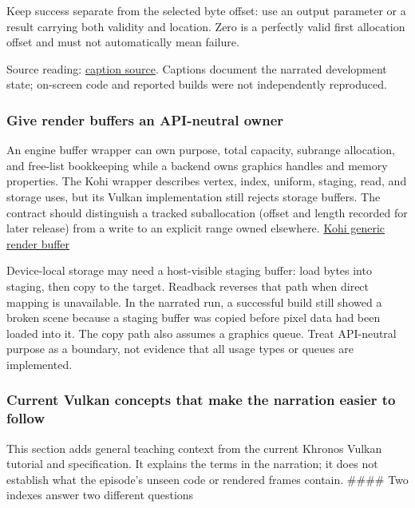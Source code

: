 Keep success separate from the selected byte offset: use an output parameter or a result carrying both validity and location. Zero is a perfectly valid first allocation offset and must not automatically mean failure.

Source reading: \href{https://www.youtube.com/watch?v=SNDJ-rGJd5A}{caption source}. Captions document the narrated development state; on-screen code and reported builds were not independently reproduced.

\subsubsection{Give render buffers an API-neutral owner}\label{06-engine-ii-ch025-give-render-buffers-an-api-neutral-owner}

An engine buffer wrapper can own purpose, total capacity, subrange allocation, and free-list bookkeeping while a backend owns graphics handles and memory properties. The Kohi wrapper describes vertex, index, uniform, staging, read, and storage uses, but its Vulkan implementation still rejects storage buffers. The contract should distinguish a tracked suballocation (offset and length recorded for later release) from a write to an explicit range owned elsewhere. \href{https://www.youtube.com/watch?v=7mNgC7dGkZs}{Kohi generic render buffer}

Device-local storage may need a host-visible staging buffer: load bytes into staging, then copy to the target. Readback reverses that path when direct mapping is unavailable. In the narrated run, a successful build still showed a broken scene because a staging buffer was copied before pixel data had been loaded into it. The copy path also assumes a graphics queue. Treat API-neutral purpose as a boundary, not evidence that all usage types or queues are implemented.

\subsubsection{Current Vulkan concepts that make the narration easier to follow}\label{06-engine-ii-ch025-current-vulkan-concepts-that-make-the-narration-easier-to-follow}

This section adds general teaching context from the current Khronos Vulkan tutorial and specification. It explains the terms in the narration; it does not establish what the episode's unseen code or rendered frames contain. \#\#\#\# Two indexes answer two different questions

